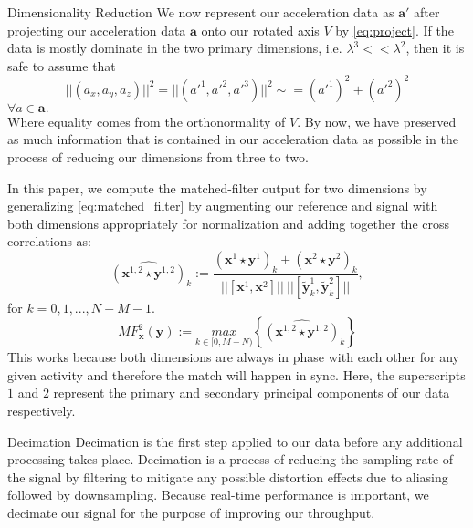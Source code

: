 \documentclass[unknownkeysallowed,final]{beamer}
\begin{document}
\begin{frame}{}
\begin{textblock}{18}
\begin{block}{\small{Dimensionality Reduction}}
%
We now represent our acceleration data as $\textbf{a}'$ after projecting our acceleration data $\textbf{a}$ onto our rotated axis $V$ by \eqref{eq:project}. If the data is mostly dominate in the two primary dimensions, i.e. $\lambda^3 << \lambda^2$, then it is safe to assume that
%
\begin{equation} \label{eq:magnitude}
||(a_x,a_y,a_z)||^2 = ||(a'^1,a'^2,a'^3)||^2 \sim = (a'^1)^2 + (a'^2)^2
\end{equation}
$ \forall a \in \textbf{a}. $ \\
%
Where equality comes from the orthonormality of $V$.
By now, we have preserved as much information that is contained in our acceleration data as possible in the process of reducing our dimensions from three to two.

In this paper, we compute the matched-filter output for two dimensions by generalizing \eqref{eq:matched_filter} by augmenting our reference and signal with both dimensions appropriately for normalization and adding together the cross correlations as:
%
\begin{equation} \label{eq:cross_correlation_2}
\widehat{(\textbf{x}^{1,2} \star \textbf{y}^{1,2})}_k := \frac{(\textbf{x}^1 \star \textbf{y}^1)_k + (\textbf{x}^2 \star \textbf{y}^2)_k}{||[ \textbf{x}^1, \textbf{x}^2 ]|| \ || [ \widetilde{\textbf{y}}_k^1, \widetilde{\textbf{y}}_k^2 ] || },
\end{equation}
%
for $ k = 0,1,...,N-M-1 $. \\
%
\begin{equation} \label{eq:matched_filter_2}
MF_{\textbf{x}}^2(\textbf{y}) := \underset{k \in [0, M-N)}{max} \left \{\widehat{(\textbf{x}^{1,2} \star \textbf{y}^{1,2})}_k \right \}
\end{equation}
%
This works because both dimensions are always in phase with each other for any given activity and therefore the match will happen in sync. Here, the superscripts $1$ and $2$ represent the primary and secondary principal components of our data respectively.
%
\end{block}

\begin{block}{\small{Decimation}}
Decimation is the first step applied to our data before any additional processing takes place.
Decimation is a process of reducing the sampling rate of the signal by filtering to mitigate any possible distortion effects due to aliasing followed by downsampling.
Because real-time performance is important, we decimate our signal for the purpose of improving our throughput.


\end{block}
\end{textblock}
\end{frame}
\end{document}
